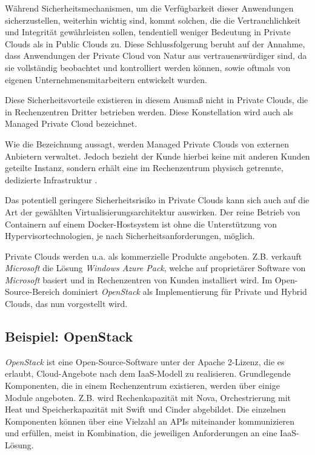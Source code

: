 \documentclass[../main.tex]{subfiles}
\begin{document}
    Während Sicherheitsmechanismen, um die Verfügbarkeit dieser Anwendungen sicherzustellen, weiterhin wichtig sind, kommt solchen, die die Vertrauchlichkeit und Integrität gewährleisten sollen, tendentiell weniger Bedeutung in Private Clouds als in Public Clouds zu. Diese Schlussfolgerung beruht auf der Annahme, dass Anwendungen der Private Cloud von Natur aus vertrauenswürdiger sind, da sie vollständig beobachtet und kontrolliert werden können, sowie oftmals von eigenen Unternehmensmitarbeitern entwickelt wurden.

    Diese Sicherheitsvorteile existieren in diesem Ausmaß nicht in Private Clouds, die in Rechenzentren Dritter betrieben werden. Diese Konstellation wird auch als Managed Private Cloud bezeichnet.

    Wie die Bezeichnung aussagt, werden Managed Private Clouds von externen Anbietern verwaltet. Jedoch bezieht der Kunde hierbei keine mit anderen Kunden geteilte Instanz, sondern erhält eine im Rechenzentrum physisch getrennte, dedizierte Infrastruktur \cite{softlayerPrivateCloud}.

    Das potentiell geringere Sicherheitsrisiko in Private Clouds kann sich auch auf die Art der gewählten Virtualisierungsarchitektur auswirken. Der reine Betrieb von Containern auf einem Docker-Hostsystem ist ohne die Unterstützung von Hypervisortechnologien, je nach Sicherheitsanforderungen, möglich.

    Private Clouds werden u.a. als kommerzielle Produkte angeboten. Z.B. verkauft \emph{Microsoft} die Lösung \emph{Windows Azure Pack}, welche auf proprietärer Software von \emph{Microsoft} basiert und in Rechenzentren von Kunden installiert wird. Im Open-Source-Bereich dominiert \emph{OpenStack} als Implementierung für Private und Hybrid Clouds, das nun vorgestellt wird.

    \subsection{Beispiel: OpenStack}
      \emph{OpenStack} ist eine Open-Source-Software unter der Apache 2-Lizenz, die es erlaubt, Cloud-Angebote nach dem IaaS-Modell zu realisieren. Grundlegende Komponenten, die in einem Rechenzentrum existieren, werden über einige Module angeboten. Z.B. wird Rechenkapazität mit Nova, Orchestrierung mit Heat und Speicherkapazität mit Swift und Cinder abgebildet. Die einzelnen Komponenten können über eine Vielzahl an APIs miteinander kommunizieren und erfüllen, meist in Kombination, die jeweiligen Anforderungen an eine IaaS-Lösung.
\end{document}
